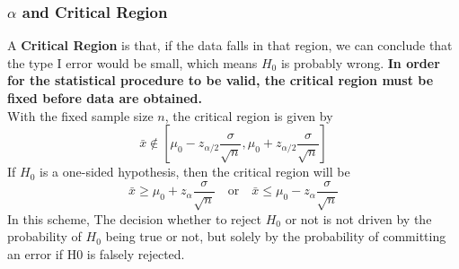 \documentclass[a4paper,12pt]{article}
\begin{document}
\subsubsection{$\alpha$ and Critical Region}
A \textbf{Critical Region} is that, if the data falls in that region, we can conclude that the type I error would be small, which means $H_0$ is probably wrong. \textbf{In order for the statistical procedure to be valid, the critical region must be fixed before data are obtained.}\\
With the fixed sample size $n$, the critical region is given by
\begin{equation}
    \bar{x} \notin [\mu_0 - z_{\alpha / 2} \frac{\sigma}{\sqrt{n}}, \mu_0 + z_{\alpha / 2} \frac{\sigma}{\sqrt{n}}]
\end{equation}
If $H_0$ is a one-sided hypothesis, then the critical region will be 
\begin{equation}
    \bar{x} \geq \mu_0 + z_{\alpha} \frac{\sigma}{\sqrt{n}} \quad \text{or} \quad \bar{x} \leq \mu_0 - z_{\alpha} \frac{\sigma}{\sqrt{n}}
\end{equation}
In this scheme, The decision whether to reject $H_0$ or not is not driven by the probability of $H_0$ being true or not, but solely by the probability of committing an error if H0 is falsely rejected.
\end{document}
